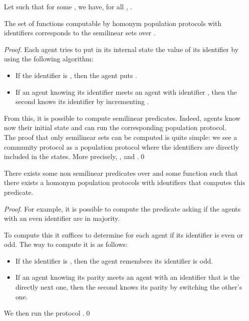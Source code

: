 \documentclass[UKenglish]{llncs}
\begin{document}
\begin{theorem}\label{hppconst}
Let  such that for some , we have, for all , .

The set of functions computable by homonym population protocols with 
identifiers corresponds to the semilinear sets over .
\end{theorem}
\begin{proof}
Each agent tries to put in its internal state the value of its identifier 
by using the following algorithm:
\begin{itemize}
\item If the identifier is , then the agent puts .
\item If an agent knowing its identifier  meets an agent with identifier , then
the second knows its identifier by incrementing .
\end{itemize}
From this,  it is possible to compute semilinear predicates.
Indeed, agents know now their initial state and can run the corresponding population protocol.\\

The proof that only semilinear sets can be computed is quite simple: we see a community protocol
as a population protocol where the identifiers are directly included in the states.
More precisely, , and .\hfill \qed

\end{proof}

\begin{proposition}\label{contrex1}
There exists some non semilinear predicates over 
and some function  such that there exists
a homonym population protocols with  identifiers that computes this predicate.
\end{proposition}
\begin{proof}
For example, it is possible to compute the predicate asking if the
 agents with an even identifier are in majority.

To compute this it suffices to determine for each agent if its identifier
is even or odd. The way to compute it is as follows:
\begin{itemize}
\item If the identifier is , then the agent remembers its identifier is odd.
\item If an agent knowing its parity meets an agent with an identifier
that is the directly next one, then
the second knows its parity by switching the other's one.
\end{itemize}
We then run the protocol .\hfill \qed

\end{proof}
\end{document}
